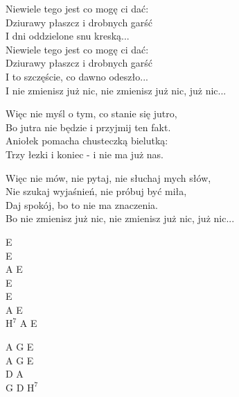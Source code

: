 \begin{text}
    Niewiele tego jest co mogę ci dać:\\
    Dziurawy płaszcz i drobnych garść\\
    I dni oddzielone snu kreską...\\
    Niewiele tego jest co mogę ci dać:\\
    Dziurawy płaszcz i drobnych garść\\
    I to szczęście, co dawno odeszło...\\
    I nie zmienisz już nic, nie zmienisz już nic, już nic...

    Więc nie myśl o tym, co stanie się jutro,\\
    Bo jutra nie będzie i przyjmij ten fakt.\\
    Aniołek pomacha chusteczką bielutką:\\
    Trzy łezki i koniec - i nie ma już nas.

    Więc nie mów, nie pytaj, nie słuchaj mych słów,\\
    Nie szukaj wyjaśnień, nie próbuj być miła,\\
    Daj spokój, bo to nie ma znaczenia.\\
    Bo nie zmienisz już nic, nie zmienisz już nic, już nic...
\end{text}
\begin{chord}
    E\\
    E\\
    A E\\
    E\\
    E\\
    A E\\
    $\mathrm{H^7}$ A E

    A G E\\
    A G E\\
    D A\\
    G D $\mathrm{H^7}$
\end{chord}
